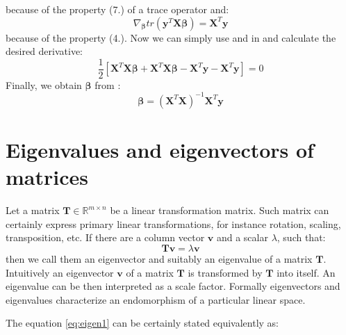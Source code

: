 \begin{appendices}
because of the property (7.) of a trace operator and:
\begin{equation}\label{eq:least5}
    \nabla_{\boldsymbol{\beta}}tr(\boldsymbol{y}^T\boldsymbol{X}\boldsymbol{\beta}) = \boldsymbol{X}^T\boldsymbol{y}
\end{equation}
because of the property (4.).
Now we can simply use  and  in  and calculate the desired derivative:
\begin{equation}\label{eq:least6}
    \frac{1}{2}[\boldsymbol{X}^T\boldsymbol{X}\boldsymbol{\beta}+\boldsymbol{X}^T\boldsymbol{X}\boldsymbol{\beta}-\boldsymbol{X}^T\boldsymbol{y}-\boldsymbol{X}^T\boldsymbol{y}] = 0
\end{equation}
Finally, we obtain $\boldsymbol{\beta}$ from :
\begin{equation}
    \boldsymbol{\beta}=(\boldsymbol{X}^T\boldsymbol{X})^{-1}\boldsymbol{X}^T\boldsymbol{y}
\end{equation}

\newpage
\section{Eigenvalues and eigenvectors of matrices}
\label{app:eigen}

Let a matrix $\boldsymbol{T} \in \mathbb{R}^{m \times n}$ be a linear transformation matrix. Such matrix can certainly express primary linear transformations, for instance rotation, scaling, transposition, etc. If there are a column vector $\boldsymbol{v}$ and a scalar $\lambda$, such that:
\begin{equation}\label{eq:eigen1}
    \boldsymbol{T}\boldsymbol{v}=\lambda{\boldsymbol{v}}
\end{equation}
then we call them an eigenvector and suitably an eigenvalue of a matrix $\boldsymbol{T}$. Intuitively an eigenvector $\boldsymbol{v}$ of a matrix $\boldsymbol{T}$ is transformed by $\boldsymbol{T}$ into itself. An eigenvalue can be then interpreted as a scale factor. Formally eigenvectors and eigenvalues characterize an endomorphism of a particular linear space.  

The equation \ref{eq:eigen1} can be certainly stated equivalently as:


\end{appendices}
